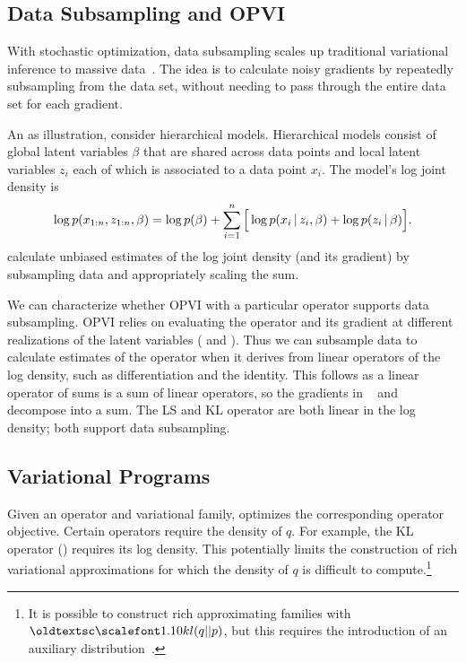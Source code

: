 
\subsection{Data Subsampling and \gls{OPVI}}

With stochastic optimization, data subsampling scales up
traditional variational inference to massive
data~\citep{Hoffman:2013,Titsias:2014}.  The idea is to calculate
noisy gradients by repeatedly subsampling from the data set,
without needing to pass through the entire data set for each
gradient.

An as illustration, consider hierarchical models. Hierarchical models consist of global latent
variables $\beta$ that are shared across data points and local latent
variables $z_i$ each of which is associated to a data point $x_i$.
The model's log joint density is
\begin{align*}
  \log p(x_{1:n}, z_{1:n}, \beta)
  = \log p(\beta) +
  \sum_{i=1}^n\Big[\log p(x_i \, | \, z_i, \beta) + \log p(z_i \, | \, \beta)\Big].
\end{align*}
\citet{Hoffman:2013} calculate unbiased estimates of the log joint
density (and its gradient) by subsampling data and appropriately
scaling the sum.

We can characterize whether \gls{OPVI} with a particular operator
supports data subsampling.  \gls{OPVI} relies on evaluating the
operator and its gradient at different realizations of the latent
variables ( and ). Thus we
can subsample data to calculate estimates of the operator when it
derives from linear operators of the log density, such as
differentiation and the identity.  This follows as a linear operator
of sums is a sum of linear operators, so the gradients in
~ and~ decompose into a sum. The \acrlong{LS}
and \acrshort{KL} operator
are both linear in the log density; both
support data subsampling.

\subsection{Variational Programs}

Given an operator and variational family,  optimizes the
corresponding operator objective.
Certain operators require the density of $q$.  For example, the
\acrshort{KL} operator () requires its log
density.  This potentially limits the construction of rich variational
approximations for which the density of $q$ is difficult to
compute.\footnote{It is possible to construct rich approximating
  families with $\textsc{kl}(q || p)$, but this requires the introduction
  of an auxiliary distribution~\citep{maaloe2016auxiliary}.}

